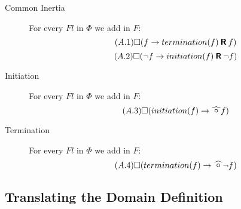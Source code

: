 \begin{description}
  \item[Common Inertia]
  For every $Fl$ in $\Phi$ we add in $F$:
  \begin{equation}\tag{$A.1$}
    \square(f\rightarrow termination(f) \mathbin{\bm{\mathsf{R}}} f)
  \end{equation}
  \begin{equation}\tag{$A.2$}
    \square(\neg f\rightarrow initiation(f) \mathbin{\bm{\mathsf{R}}} \neg f)
  \end{equation}
  \item[Initiation]
  For every $Fl$ in $\Phi$ we add in $F$:
  \begin{equation}\tag{$A.3$}
    \alwaysF(initiation(f)\rightarrow\wnext f)
  \end{equation}
  \item[Termination]
  For every $Fl$ in $\Phi$ we add in $F$:
  \begin{equation}\tag{$A.4$}
    \alwaysF(termination(f)\rightarrow\wnext \neg f)
  \end{equation}
\end{description}

\subsection{Translating the Domain Definition}\label{sec:trans_def_ltl}

